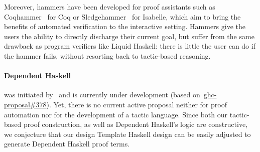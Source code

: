 Moreover, hammers have been developed for proof assistants
such as Coqhammer~\cite{CoqHammer, Coqhammer-sauto} for Coq or
Sledgehammer~\cite{Sledgehammer, SledgehammerSMT} for Isabelle, which
aim to bring the benefits of automated verification to the interactive
setting. Hammers give the users the ability to directly discharge
their current goal, but suffer from the same drawback as program
verifiers like Liquid Haskell: there is little the user can do if the
hammer fails, without resorting back to tactic-based reasoning.  
%  

\paragraph{Dependent Haskell} was initiated by~\citet{Eisenberg16} 
and is currently under development
(based on~\href{https://github.com/ghc-proposals/ghc-proposals/pull/378}{ghc-proposal\#378}).
%
Yet, there is no current active proposal neither for proof automation 
nor for the development of a tactic language. 
Since both our tactic-based proof construction, as well as Dependent 
Haskell's logic  are constructive, we conjecture that our design Template 
Haskell design can be easily adjusted to generate Dependent Haskell proof terms. 

